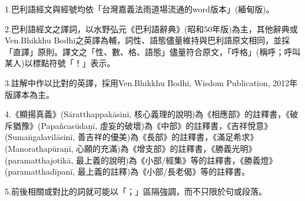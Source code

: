 1.巴利語經文與經號均依「台灣嘉義法雨道場流通的word版本」(緬甸版)。

2.巴利語經文之譯詞，以水野弘元《巴利語辭典》(昭和50年版)為主，其他辭典或Ven.Bhikkhu Bodhi之英譯為輔，詞性、語態儘量維持與巴利語原文相同，並採「直譯」原則。譯文之「性、數、格、語態」儘量符合原文，「呼格」(稱呼；呼叫某人)以標點符號「！」表示。

3.註解中作以比對的英譯，採用Ven.Bhikkhu Bodhi, Wisdom Publication, 2012年版譯本為主。

4.《顯揚真義》(Sāratthappakāsinī, 核心義理的說明)為《相應部》的註釋書，《破斥猶豫》(Papañcasūdaṇī, 虛妄的破壞)為《中部》的註釋書，《吉祥悅意》(Sumaṅgalavilāsinī, 善吉祥的優美)為《長部》的註釋書，《滿足希求》(Manorathapūraṇī, 心願的充滿)為《增支部》的註釋書，《勝義光明》(paramatthajotikā, 最上義的說明)為《小部/經集》等的註釋書，《勝義燈》(paramatthadīpanī, 最上義的註釋)為《小部/長老偈》等的註釋書。

5.前後相關或對比的詞就可能以「；」區隔強調，而不只限於句或段落。